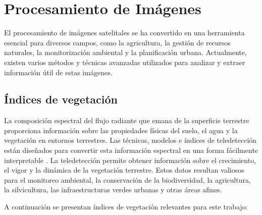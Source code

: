 \section{Procesamiento de Imágenes}
	El procesamiento de imágenes satelitales se ha convertido en una herramienta esencial para diversos
	campos, como la agricultura, la gestión de recursos naturales, la monitorización ambiental y 
 	la planificación urbana. Actualmente, existen varios métodos y técnicas avanzadas utilizados para
  	analizar y extraer información útil de estas imágenes. 
	

\subsection{Índices de vegetación}

La composición espectral del flujo radiante que emana de la superficie terrestre 
proporciona información sobre las propiedades físicas del suelo, el agua y la vegetación 
en entornos terrestres. Las técnicas, modelos e índices de teledetección están diseñados 
para convertir esta información espectral en una forma fácilmente interpretable \citep{Bannari1995}.
La teledetección permite obtener información sobre el crecimiento, el vigor y la dinámica de la vegetación terrestre. 
Estos datos resultan valiosos para el monitoreo ambiental, la conservación de la biodiversidad, la agricultura, la silvicultura, 
las infraestructuras verdes urbanas y otras áreas afines.

A continuación se presentan índices de vegetación relevantes para este trabajo:

